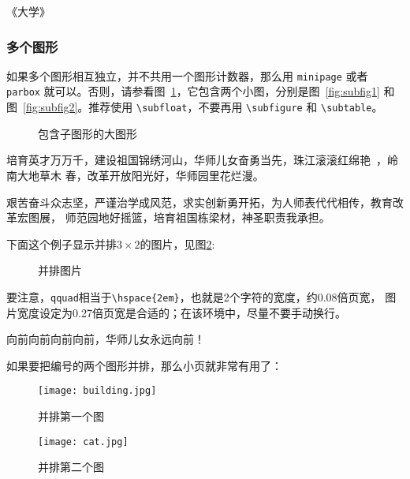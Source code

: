 \hfill \pozhehao《大学》

\subsubsection{多个图形}
\label{sec:multifig}

如果多个图形相互独立，并不共用一个图形计数器，那么用 \verb|minipage| 或者
\verb|parbox| 就可以。否则，请参看图~\ref{fig:big1}，它包含两个小图，分别是图~\ref{fig:subfig1} 
和图~\ref{fig:subfig2}。推荐使用 \verb|\subfloat|，不要再用
\verb|\subfigure| 和 \verb|\subtable|。
\begin{figure}[htb]
  \centering%
  \hspace{4em}%
  \caption{包含子图形的大图形}
  \label{fig:big1}
\end{figure}

培育英才万万千，建设祖国锦绣河山，华师儿女奋勇当先，珠江滚滚红绵艳~，岭南大地草木
春，改革开放阳光好，华师园里花烂漫。

艰苦奋斗众志坚，严谨治学成风范，求实创新勇开拓，为人师表代代相传，教育改革宏图展，
师范园地好摇篮，培育祖国栋梁材，神圣职责我承担。


下面这个例子显示并排$3\times2$的图片，见图\ref{fig:subfig:3x2}:
\begin{figure}[htb]
\centering
{} \qquad
{} \qquad
{} \qquad
{} \qquad
{} \qquad
{}
\caption{并排图片}
\label{fig:subfig:3x2}
\end{figure}

要注意，\texttt{qquad}相当于\verb|\hspace{2em}|，也就是2个字符的宽度，约0.08倍页宽，
图片宽度设定为0.27倍页宽是合适的；在该环境中，尽量不要手动换行。

向前向前向前向前，华师儿女永远向前！

如果要把编号的两个图形并排，那么小页就非常有用了：
\begin{figure}[htb]
\begin{minipage}{0.48\textwidth}
  \centering
  \texttt{[image: building.jpg]}
  \caption{并排第一个图}
  \label{fig:parallel1}
\end{minipage}\hfill
\begin{minipage}{0.48\textwidth}
  \centering
  \texttt{[image: cat.jpg]}
  \caption{并排第二个图}
  \label{fig:parallel2}
\end{minipage}
\end{figure}

